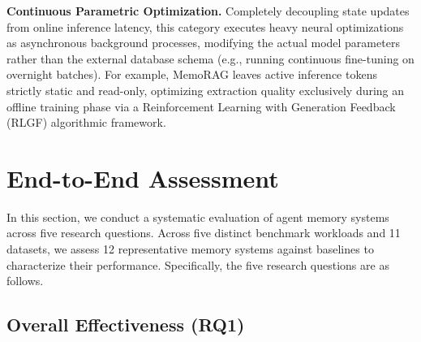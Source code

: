 \documentclass{llmxive}
\begin{document}

\noindent  \textbf{Continuous Parametric Optimization.}
Completely decoupling state updates from online inference latency, this category executes heavy neural optimizations as asynchronous background processes, modifying the actual model parameters rather than the external database schema (e.g., running continuous fine-tuning on overnight batches).
For example, MemoRAG leaves active inference tokens strictly static and read-only, optimizing extraction quality exclusively during an offline training phase via a Reinforcement Learning with Generation Feedback (RLGF) algorithmic framework. 


\section{End-to-End Assessment}
\label{sec:overall}

In this section, we conduct a systematic evaluation of agent memory systems across five research questions.
Across five distinct benchmark workloads and 11 datasets, we assess 12 representative memory systems against baselines to characterize their performance.
Specifically, the five research questions are as follows.


\subsection{Overall Effectiveness (RQ1)}
\label{subsec:effectiveness}
\end{document}

